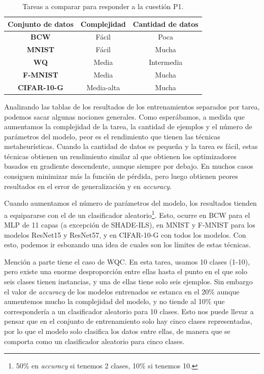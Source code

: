 \begin{table}[]
\centering
\begin{tabular}{|c|c|c|}
\hline
\textbf{Conjunto de datos} & \textbf{Complejidad} & \textbf{Cantidad de datos} \\ \hline
\textbf{BCW}               & Fácil                & Poca                       \\ \hline
\textbf{MNIST}             & Fácil                & Mucha                      \\ \hline
\textbf{WQ}      & Media                & Intermedia                 \\ \hline
\textbf{F-MNIST}           & Media                & Mucha                      \\ \hline
\textbf{CIFAR-10-G}             & Media-alta           & Mucha                      \\ \hline
\end{tabular}
\caption{Tareas a comparar para responder a la cuestión P1.}
\label{tab:expP1}
\end{table}

Analizando las tablas de los resultados de los entrenamientos separados por tarea, podemos sacar algunas nociones generales. Como esperábamos, a medida que aumentamos la complejidad de la tarea, la cantidad de ejemplos y el número de parámetros del modelo, peor es el rendimiento que tienen las técnicas metaheurísticas. Cuando la cantidad de datos es pequeña y la tarea es fácil, estas técnicas obtienen un rendimiento similar al que obtienen los optimizadores basados en gradiente descendente, aunque siempre por debajo. En muchos casos consiguen minimizar más la función de pérdida, pero luego obtienen peores resultados en el error de generalización y en \textit{accuracy}.

Cuando aumentamos el número de parámetros del modelo, los resultados tienden a equipararse con el de un clasificador aleatorio\footnote{50\% en \textit{accuracy} si tenemos 2 clases, 10\% si tenemos 10.}. Esto, ocurre en BCW para el MLP de 11 capas (a excepción de SHADE-ILS), en MNIST y F-MNIST para los modelos ResNet15 y ResNet57, y en CIFAR-10-G con todos los modelos. Con esto, podemos ir esbozando una idea de cuales son los límites de estas técnicas.

Mención a parte tiene el caso de WQC. En esta tarea, usamos 10 clases (1-10), pero existe una enorme desproporción entre ellas hasta el punto en el que solo seis clases tienen instancias, y una de ellas tiene solo seis ejemplos. Sin embargo el valor de \textit{accuracy} de los modelos entrenados se estanca en el 20\% aunque aumentemos mucho la complejidad del modelo, y no tiende al 10\% que correspondería a un clasificador aleatorio para 10 clases. Esto nos puede llevar a pensar que en el conjunto de entrenamiento solo hay cinco clases representadas, por lo que el modelo solo clasifica los datos entre ellas, de manera que se comporta como un clasificador aleatorio para cinco clases.

